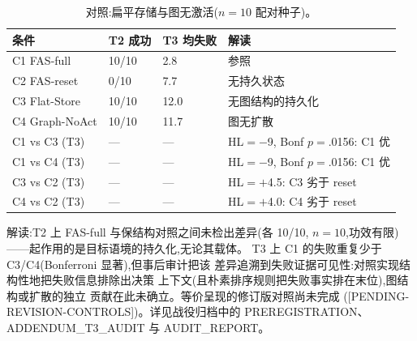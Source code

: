 \documentclass[10pt,a4paper]{ctexart}
\begin{document}
\begin{table}[h]
\centering\small
\caption{对照:扁平存储与图无激活($n{=}10$ 配对种子)。}
\label{tab:s-controls-zh}
\begin{tabular}{L{3.0cm}L{3.0cm}L{3.0cm}L{5.4cm}}
\toprule
\textbf{条件} & \textbf{T2 成功} & \textbf{T3 均失败} & \textbf{解读} \\
\midrule
C1 FAS-full & 10/10 & 2.8 & 参照 \\
C2 FAS-reset & 0/10 & 7.7 & 无持久状态 \\
C3 Flat-Store & 10/10 & 12.0 & 无图结构的持久化 \\
C4 Graph-NoAct & 10/10 & 11.7 & 图无扩散 \\
\midrule
C1 vs C3 (T3) & --- & --- & HL${=}{-}$9, Bonf $p{=}$.0156: C1 优 \\
C1 vs C4 (T3) & --- & --- & HL${=}{-}$9, Bonf $p{=}$.0156: C1 优 \\
C3 vs C2 (T3) & --- & --- & HL${=}{+}$4.5: C3 劣于 reset \\
C4 vs C2 (T3) & --- & --- & HL${=}{+}$4.0: C4 劣于 reset \\
\bottomrule
\end{tabular}
\end{table}

解读:T2 上 FAS-full 与保结构对照之间未检出差异(各 10/10,
$n{=}10$,功效有限)——起作用的是目标语境的持久化,无论其载体。
T3 上 C1 的失败重复少于 C3/C4(Bonferroni 显著),但事后审计把该
差异追溯到失败证据可见性:对照实现结构性地把失败信息排除出决策
上下文(且朴素排序规则把失败事实排在末位),图结构或扩散的独立
贡献在此未确立。等价呈现的修订版对照尚未完成
([PENDING-REVISION-CONTROLS])。详见战役归档中的 PREREGISTRATION、
ADDENDUM\_T3\_AUDIT 与 AUDIT\_REPORT。
\end{document}

